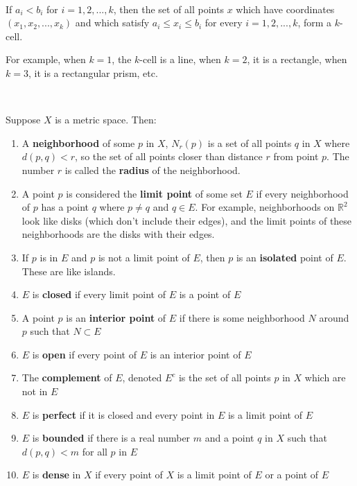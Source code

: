 \documentclass{article}
\begin{document}
\begin{definition}[k-cell]
\

If $a_i < b_i$ for $i = 1, 2, ..., k$, then the set of all points $x$ which have coordinates $(x_1, x_2, ..., x_k)$ and which satisfy $a_i \leq x_i \leq b_i$ for every $i = 1,2, ... , k$, form a $k$-cell. 

For example, when $k=1$, the $k$-cell is a line, when $k=2$, it is a rectangle, when $k=3$, it is a rectangular prism, etc. 
\end{definition}

\begin{definition}
\

Suppose $X$ is a metric space. Then:

\begin{enumerate}
    \item A \textbf{neighborhood} of some $p$ in $X$, $N_r(p)$ is a set of all points $q$ in $X$ where $d(p,q) < r$, so the set of all points closer than distance $r$ from point $p$. The number $r$ is called the \textbf{radius} of the neighborhood.
    \item A point $p$ is considered the \textbf{limit point} of some set $E$ if every neighborhood of $p$ has a point $q$ where $p \neq q$ and $q \in E$. For example, neighborhoods on $\mathbb{R}^2$ look like disks (which don't include their edges), and the limit points of these neighborhoods are the disks with their edges.
    \item If $p$ is in $E$ and $p$ is not a limit point of $E$, then $p$ is an \textbf{isolated} point of $E$. These are like islands.
    \item $E$ is \textbf{closed} if every limit point of $E$ is a point of $E$
    \item A point $p$ is an \textbf{interior point} of $E$ if there is some neighborhood $N$ around $p$ such that $N \subset E$
    \item $E$ is \textbf{open} if every point of $E$ is an interior point of $E$
    \item The \textbf{complement} of $E$, denoted $E^c$ is the set of all points $p$ in $X$ which are not in $E$
    \item $E$ is \textbf{perfect} if it is closed and every point in $E$ is a limit point of $E$   
    \item $E$ is \textbf{bounded} if there is a real number $m$ and a point $q$ in $X$ such that $d(p,q) < m$ for all $p$ in $E$
    \item $E$ is \textbf{dense} in $X$ if every point of $X$ is a limit point of $E$ or a point of $E$ 
\end{enumerate}

\end{definition}
\end{document}
